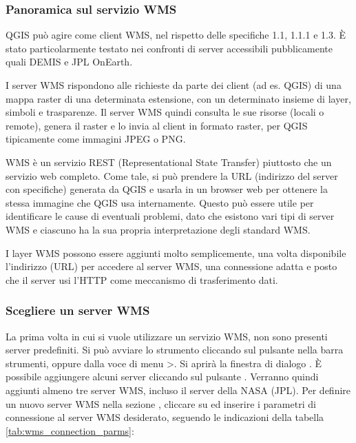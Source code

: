 \subsubsection{Panoramica sul servizio WMS}\label{sec:ogc-wms-about}

QGIS può agire come client WMS, nel rispetto delle specifiche 1.1, 1.1.1 e 1.3.
È stato particolarmente testato nei confronti di server accessibili pubblicamente
quali DEMIS e JPL OnEarth.

I server WMS rispondono alle richieste da parte dei client (ad es. QGIS) di una mappa raster
di una determinata estensione, con un determinato insieme di layer, simboli e trasparenze.
Il server WMS quindi consulta le sue risorse (locali o remote), genera il raster e lo invia
al client in formato raster, per QGIS tipicamente come immagini JPEG o PNG.

WMS è un servizio REST (Representational State Transfer) piuttosto che un servizio web completo.
Come tale, si può prendere la URL (indirizzo del server con specifiche) generata da QGIS e usarla
in un browser web per ottenere la stessa immagine che QGIS usa internamente. Questo può essere
utile per identificare le cause di eventuali problemi, dato che esistono vari tipi di server
WMS e ciascuno ha la sua propria interpretazione degli standard WMS.

I layer WMS possono essere aggiunti molto semplicemente, una volta
disponibile l'indirizzo (URL) per accedere al server WMS, una connessione adatta
e posto che il server usi l’HTTP come meccanismo di trasferimento dati.

\subsubsection{Scegliere un server WMS}\label{sec:ogc-wms-servers}

La prima volta in cui si vuole utilizzare un servizio WMS, non sono presenti
server predefiniti. Si può avviare lo strumento cliccando sul pulsante
 nella barra strumenti, 
oppure dalla voce di menu
>.
Si aprirà la finestra di dialogo . È
possibile aggiungere alcuni server cliccando sul pulsante
. Verranno quindi aggiunti almeno tre
server WMS, incluso il server della NASA (JPL). Per definire un nuovo server WMS
nella sezione , cliccare su  ed inserire
i parametri di connessione al server WMS desiderato, seguendo le indicazioni della
tabella \ref{tab:wms_connection_parms}:

